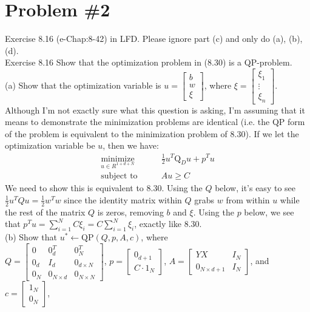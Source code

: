 \documentclass[12pt]{article}
\begin{document}
	\section*{Problem \#2}
	Exercise 8.16 (e-Chap:8-42) in LFD. Please ignore part (c) and only do (a), (b), (d). \\
	Exercise 8.16
	Show that the optimization problem in (8.30) is a QP-problem. \\
	(a) Show that the optimization variable is 
	$u =\left[\begin{array}{c}
		b\\
		w\\
		\xi
	\end{array}\right]$, where $\xi =\left[\begin{array}{c}
	\xi_1\\
	\vdots\\
	\xi_n
	\end{array}\right]$. \\
	Although I'm not exactly sure what this question is asking, I'm assuming that it means to demonstrate the minimization problems are identical (i.e. the QP form of the problem is equivalent to the minimization problem of 8.30). If we let the optimization variable be $u$, then we have:
		\begin{align*}
		\underset{u \in R^{1+d+N}}{\text{minimize}} &\qquad \frac{1}{2}u^T\text{Q}_D u+p^{T}u \\
		\text{subject to} & \qquad Au \ge C
		\end{align*}
	We need to show this is equivalent to 8.30. Using the $Q$ below, it's easy to see $\frac{1}{2}u^TQu = \frac{1}{2}w^Tw$ since the identity matrix within $Q$ grabs $w$ from within $u$ while the rest of the matrix $Q$ is zeros, removing $b$ and $\xi$. Using the $p$ below, we see that $p^T u = \sum_{i=1}^{N} C\xi_i = C\sum_{i=1}^{N} \xi_i$, exactly like 8.30.
	\\ 
	(b) Show that $u^* \leftarrow \text{QP}(Q,p,A,c)$, where \\
	$Q =\left[\begin{array}{ccc}
	0&0_d^T&0_N^T\\
	0_d&I_d&0_{d \times N}\\
	0_N&0_{N \times d}&0_{N \times N}
	\end{array}\right]$, $p =\left[\begin{array}{c}
	0_{d+1} \\
	C \cdot 1_N
	\end{array} \right]$, $A =\left[\begin{array}{cc}
	YX&I_N\\
	0_{N \times d+1}&I_N
	\end{array}\right]$, and $c =\left[\begin{array}{c}
	1_N \\
	0_N
	\end{array} \right]$,\\
\end{document}

